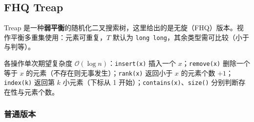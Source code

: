 \subsection{FHQ Treap}

Treap 是一种\textbf{弱平衡}的随机化二叉搜索树，这里给出的是无旋（FHQ）版本。视作平衡多重集使用：元素可重复，$T$ 默认为 \texttt{long long}，其余类型需可比较（小于与判等）。

各操作单次期望复杂度 $\mathcal{O}(\log n)$：\texttt{insert(x)} 插入一个 $x$；\texttt{remove(x)} 删除一个等于 $x$ 的元素（不存在则无事发生）；\texttt{rank(x)} 返回小于 $x$ 的元素个数 $+1$；\texttt{index(k)} 返回第 $k$ 小元素（下标从 1 开始）；\texttt{contains(x)}、\texttt{size()} 分别判断存在性与元素个数。

\subsubsection{普通版本}

